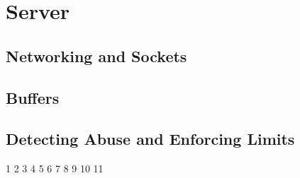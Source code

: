 \section{Server}

\subsection{Networking and Sockets}

\subsection{Buffers}

\subsection{Detecting Abuse and Enforcing Limits}
1
2
3
4
5
6
7
8
9
10
11
